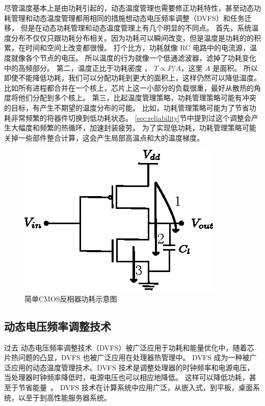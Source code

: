 尽管温度基本上是由功耗引起的，动态温度管理也需要修正功耗特性，甚至动态功耗管理和动态温度管理都用相同的措施想动态电压频率调整（DVFS）和任务迁移，
但是在动态功耗管理和动态温度管理上有几个明显的不同点。
首先，系统温度分布不仅仅只跟功耗分布相关。因为功耗可以瞬间改变，但是温度是功耗的的积累，在时间和空间上改变都很慢。
打个比方，功耗就像 RC 电路中的电流源，温度就像各个节点的电压。
所以温度的行为就像一个低通滤波器，滤掉了功耗变化中的高频部分。
第二，温度正比于功耗密度 ， $ T \propto P/A$，这里 $A$ 是面积。
所以即使不能降低功耗，我们可以分配功耗到更大的面积上，这样仍然可以降低温度。
比如所有进程都合并在一个核上，芯片上这一小部分的负载很重，最好从散热的角度将他们分配到多个核上。
第三，比起温度管理策略，功耗管理策略可能有冲突的目标，有产生不期望的温度分布的可能。
比如，功耗管理策略可能为了节省功耗非常频繁的将器件切换到低功耗状态。
\ref{sec:reliability}节中提到过这个调整会产生大幅度和频繁的热循环，加速封装疲劳。
为了实现低功耗，功耗管理策略可能关掉一些部件整合计算，这会产生局部高温点和大的温度梯度。
\\
\begin{figure}
  \centering
    \includegraphics[width=0.7\columnwidth]{fig/inverter}
  \caption{简单CMOS反相器功耗示意图}\label{fig:inverter}
\end{figure}

\subsection{动态电压频率调整技术}\label{sec:DVFS}

过去 动态电压频率调整技术（DVFS）被广泛应用于功耗和能量优化中，随着芯片热问题的凸显，DVFS 也被广泛应用在处理器热管理中。
DVFS 成为一种被广泛应用的动态温度管理技术。DVFS 技术是调整处理器的时钟频率和电源电压，当处理器时钟频率降低时，电源电压也可以相应地降低。
这样可以降低功耗，甚至于节省能量~。
DVFS 技术在计算系统中应用广泛，从嵌入式，到平板，桌面系统，以至于到高性能服务器系统。

